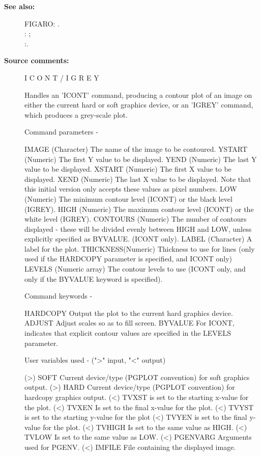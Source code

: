 \begin{description}
\begin{description}
\item [\textbf{See also:}]
FIGARO: .\\
: ;\\
:.\\

\item [\textbf{Source comments:}]
\begin{terminalv}
 I C O N T    /    I G R E Y

 Handles an 'ICONT' command, producing a contour plot of an
 image on either the current hard or soft graphics device,
 or an 'IGREY' command, which produces a grey-scale plot.

 Command parameters -

 IMAGE    (Character) The name of the image to be contoured.
 YSTART   (Numeric) The first Y value to be displayed.
 YEND     (Numeric) The last Y value to be displayed.
 XSTART   (Numeric) The first X value to be displayed.
 XEND     (Numeric) The last X value to be displayed.
          Note that this initial version only accepts these
          values as pixel numbers.
 LOW      (Numeric) The minimum contour level (ICONT) or
          the black level (IGREY).
 HIGH     (Numeric) The maximum contour level (ICONT) or
          the white level (IGREY).
 CONTOURS (Numeric) The number of contours displayed - these
          will be divided evenly between HIGH and LOW, unless
          explicitly specified as BYVALUE. (ICONT only).
 LABEL    (Character) A label for the plot.
 THICKNESS(Numeric) Thickness to use for lines (only used if
          the HARDCOPY parameter is specified, and ICONT only)
 LEVELS   (Numeric array) The contour levels to use (ICONT only,
          and only if the BYVALUE keyword is specified).

 Command keywords -

 HARDCOPY Output the plot to the current hard graphics device.
 ADJUST   Adjust scales so as to fill screen.
 BYVALUE  For ICONT, indicates that explicit contour values are
          specified in the LEVELS parameter.

 User variables used -   (">" input, "<" output)

 (>) SOFT     Current device/type (PGPLOT convention) for soft
              graphics output.
 (>) HARD     Current device/type (PGPLOT convention) for hardcopy
              graphics output.
 (<) TVXST    is set to the starting x-value for the plot.
 (<) TVXEN    Is set to the final x-value for the plot.
 (<) TVYST    is set to the starting y-value for the plot
 (<) TVYEN    is set to the final y-value for the plot.
 (<) TVHIGH   Is set to the same value as HIGH.
 (<) TVLOW    Is set to the same value as LOW.
 (<) PGENVARG Arguments used for PGENV.
 (<) IMFILE   File containing the displayed image.


\end{terminalv}
\end{description}
\end{description}
